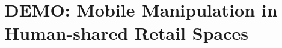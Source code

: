 \chapter{DEMO: Mobile Manipulation in Human-shared Retail Spaces}
\label{rss_spahn_24}



%

\newpage













\newpage
